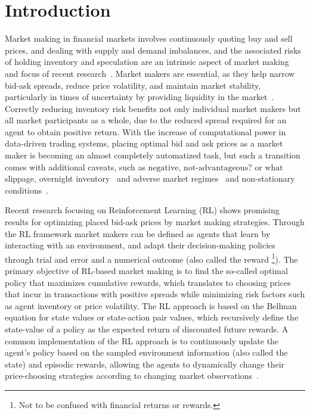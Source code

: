 \section{Introduction}
\label{sec:introduction}

Market making in financial markets involves continuously quoting buy and sell prices, and dealing with supply and demand imbalances,
and the associated risks of holding inventory and speculation are an intrinsic aspect of market making and focus of recent research~\cite{Cartea2015, Gasperov2021}.
Market makers are essential, as they help narrow bid-ask spreads, reduce price volatility, and maintain market stability,
particularly in times of uncertainty by providing liquidity in the market~\cite{Glosten1985, OHara1995}.
Correctly reducing inventory risk benefits not only individual market makers but all market participants as a whole,
due to the reduced spread required for an agent to obtain positive return.
With the increase of computational power in data-driven trading systems,
placing optimal bid and ask prices as a market maker is becoming an almost completely automatized task,
but such a transition comes with additional caveats, such as $\text{negative, not-advantageous? or what}$ slippage,
overnight inventory~\cite{Cartea2015, Avellaneda2008} and adverse market regimes~\cite{Cont2010, Bouchaud2018} and non-stationary conditions~\cite{Gasperov2021}.

Recent research focusing on Reinforcement Learning (RL) shows promising results for optimizing placed bid-ask prices by market making strategies.
Through the RL framework market makers can be defined as agents that learn by interacting with an environment,
and adapt their decision-making policies through trial and error and a numerical outcome
(also called the reward \footnote{Not to be confused with financial returns or rewards.}).
The primary objective of RL-based market making is to find the so-called optimal policy that maximizes cumulative rewards,
which translates to choosing prices that incur in transactions with positive spreads while minimizing risk factors such as agent inventory or price volatility.
The RL approach is based on the Bellman equation for state values or state-action pair values,
which recursively define the state-value of a policy as the expected return of discounted future rewards.
A common implementation of the RL approach is to continuously update the agent's policy based on the sampled environment information (also called the state) and episodic rewards,
allowing the agents to dynamically change their price-choosing strategies according to changing market observations~\cite{Sutton2018}.


